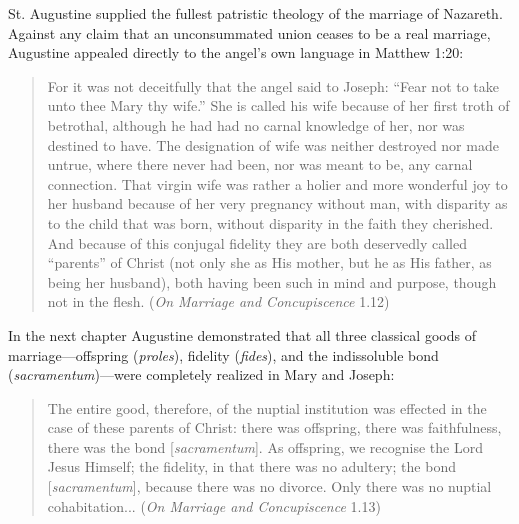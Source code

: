 St. Augustine supplied the fullest patristic theology of the marriage of Nazareth. Against any claim that an unconsummated union ceases to be a real marriage, Augustine appealed directly to the angel's own language in Matthew 1:20:

\begin{quote}\small
For it was not deceitfully that the angel said to Joseph: ``Fear not to take unto thee Mary thy wife.'' She is called his wife because of her first troth of betrothal, although he had had no carnal knowledge of her, nor was destined to have. The designation of wife was neither destroyed nor made untrue, where there never had been, nor was meant to be, any carnal connection. That virgin wife was rather a holier and more wonderful joy to her husband because of her very pregnancy without man, with disparity as to the child that was born, without disparity in the faith they cherished. And because of this conjugal fidelity they are both deservedly called ``parents'' of Christ (not only she as His mother, but he as His father, as being her husband), both having been such in mind and purpose, though not in the flesh. (\textit{On Marriage and Concupiscence} 1.12)
\end{quote}

In the next chapter Augustine demonstrated that all three classical goods of marriage---offspring (\textit{proles}), fidelity (\textit{fides}), and the indissoluble bond (\textit{sacramentum})---were completely realized in Mary and Joseph:

\begin{quote}\small
The entire good, therefore, of the nuptial institution was effected in the case of these parents of Christ: there was offspring, there was faithfulness, there was the bond [\textit{sacramentum}]. As offspring, we recognise the Lord Jesus Himself; the fidelity, in that there was no adultery; the bond [\textit{sacramentum}], because there was no divorce. Only there was no nuptial cohabitation... (\textit{On Marriage and Concupiscence} 1.13)
\end{quote}

